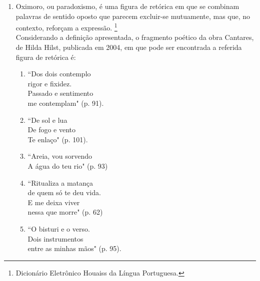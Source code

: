 \documentclass[10pt,a4paper]{article}
\begin{document}
\begin{multicols}{2}
\begin{enumerate}
	Quanto \`as influ\^enicas  que a internet pode exercer sobre os usu\'arios, a autora expressa uma rea\c{c}\~ao ir\^onica no trecho:

		\begin{enumerate}
		\item ``Marquei umas alternativas esdr\'uxulas, que nada tinham a ver"
		\item ``Os acontecimentos da sua infância a marcaram at\'e os doze anos"
		\item ``Dia desses resolvi fazer um teste proposto por um site da internet"
		\item ``Respondi a todas as perguntas e o resultado foi o seguinte"
	       \item ``Fiquei radiante: eu havia realizado uma consulta paranormal com o pai da psican\'alise"
		\end{enumerate}

	\item Oximoro, ou paradoxismo, \'e uma figura de ret\'orica em que se combinam palavras de sentido oposto que parecem excluir-se mutuamente, mas que, no contexto, refor\c{c}am a express\~ao. \footnote{Dicion\'ario Eletr\^onico Houaiss da L\'ingua Portuguesa.} \\
		Considerando a defini\c{c}\~ao apresentada, o fragmento po\'etico da obra Cantares, de Hilda Hilst, publicada em 2004, em que pode ser encontrada a referida figura de ret\'orica \'e:
		\begin{enumerate}
		\item ``Dos dois contemplo \\
			rigor e fixidez.\\
			Passado e sentimento\\
			me contemplam" (p. 91).
		\item ``De sol e lua\\
			De fogo e vento \\
			Te enla\c{c}o" (p. 101).
		\item ``Areia, vou sorvendo \\
			A \'agua do teu rio" (p. 93)
		\item ``Ritualiza a matan\c{c}a \\
			de quem s\'o te deu vida. \\
			E me deixa viver \\
			nessa que morre" (p. 62)
		\item ``O bisturi e o verso. \\
			Dois instrumentos\\
			entre as minhas m\~aos" (p. 95).
		\end{enumerate}



\end{enumerate}
\end{multicols}
\end{document}

